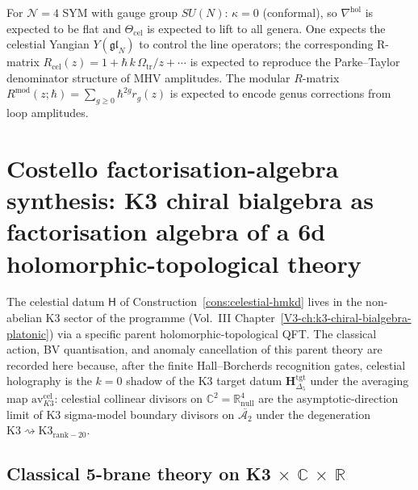 \begin{conjecture}[Celestial holographic datum for
$\mathcal N=4$ SYM; \ClaimStatusConjectured]
For $\mathcal N=4$ SYM with gauge group $SU(N)$:
$\kappa=0$ (conformal), so
$\nabla^{\mathrm{hol}}$ is expected to be flat and
$\Theta_{\mathrm{cel}}$ is expected to lift to all genera. One
expects the celestial Yangian $Y(\mathfrak{gl}_N)$ to control the line
operators; the corresponding R-matrix
$R_{\mathrm{cel}}(z)=1+\hbar\,k\,\Omega_{\mathrm{tr}}/z+\cdots$ is expected to reproduce the
Parke--Taylor denominator structure of MHV amplitudes.
The modular $R$-matrix
$R^{\mathrm{mod}}(z;\hbar)=\sum_{g\ge 0}\hbar^{2g}r_g(z)$
is expected to encode genus corrections from loop amplitudes.
\end{conjecture}

\section{Costello factorisation-algebra synthesis: K3 chiral bialgebra as factorisation algebra of a 6d holomorphic-topological theory}
\label{sec:costello-k3-dna}

The celestial datum $\mathsf{H}$ of Construction~\ref{cons:celestial-hmkd}
lives in the non-abelian K3 sector of the programme (Vol.~III
Chapter~\ref{V3-ch:k3-chiral-bialgebra-platonic}) via a
specific parent holomorphic-topological QFT. The classical action,
BV quantisation, and anomaly cancellation of this parent theory are
recorded here
because, after the finite Hall--Borcherds recognition gates, celestial
holography is the $k=0$ shadow of the K3 target datum
$\mathbf{H}_{\Delta_5}^{\mathrm{tgt}}$ under the averaging map
$\mathrm{av}^{\mathrm{cel}}_{K3}$: celestial collinear divisors on
$\mathbb{C}^2 = \mathbb{R}^4_{\mathrm{null}}$ are the
asymptotic-direction limit of K3 sigma-model boundary
divisors on $\overline{\mathcal{A}_2}$ under the degeneration
$\mathrm{K3} \rightsquigarrow \mathrm{K3}_{\mathrm{rank-20}}$.

\subsection{Classical 5-brane theory on K3 $\times$ $\mathbb{C}$ $\times$ $\mathbb{R}$}
\label{subsec:costello-classical-action}

